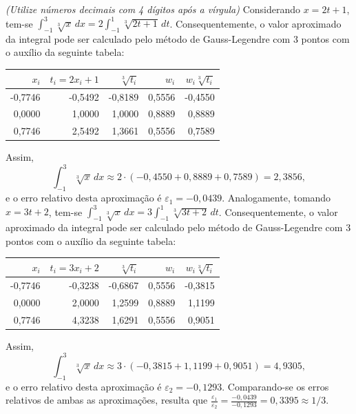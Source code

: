 \documentclass[12pt,a4paper]{article}
\begin{document}
\begin{ExerciseList}
{\color{blue} \textit{(Utilize números decimais com 4 dígitos após a vírgula)}}
\Answer Considerando $x = 2t + 1$, tem-se $
    \int_{-1}^3 \sqrt[3]{x}\, dx
= 2 \int_{-1}^1 \sqrt[3]{2t+1} \,dt
$. Consequentemente, o valor aproximado da integral pode ser calculado pelo método de Gauss-Legendre com 3 pontos com o auxílio da seguinte tabela:
\medskip
\begin{center}
\begin{tabular}{|r|r|r|r|r|}
\hline 
$x_i$ & $t_i = 2x_i+1$ & $\sqrt[3]{t_i}$ & $w_i$ & $w_i \sqrt[3]{t_i}$ \\ 
\hline 
-0,7746 & -0,5492 & -0,8189 & 0,5556 & -0,4550 \\ 
\hline 
 0,0000 &  1,0000 &  1,0000 & 0,8889 &  0,8889 \\ 
\hline 
 0,7746 &  2,5492 &  1,3661 & 0,5556 &  0,7589 \\ 
\hline 
\end{tabular}
\end{center}
\medskip
Assim,
\[
\int_{-1}^3 \sqrt[3]{x}\, dx
\approx 2 \cdot \left( -0,4550 + 0,8889 + 0,7589\right)
= 2,3856,
\]
e o erro relativo desta aproximação é $\varepsilon_1 = -0,0439$.
Analogamente, tomando $x = 3t + 2$, tem-se
$
    \int_{-1}^3 \sqrt[3]{x}\, dx
= 3 \int_{-1}^1 \sqrt[3]{3t+2} \,dt
$. Consequentemente, o valor aproximado da integral pode ser calculado pelo método de Gauss-Legendre com 3 pontos com o auxílio da seguinte tabela:
\medskip
\begin{center}
\begin{tabular}{|r|r|r|r|r|}
\hline 
$x_i$ & $t_i = 3x_i+2$ & $\sqrt[3]{t_i}$ & $w_i$ & $w_i \sqrt[3]{t_i}$ \\ 
\hline 
-0,7746 & -0,3238 & -0,6867 & 0,5556 & -0,3815 \\ 
\hline 
 0,0000 &  2,0000 &  1,2599 & 0,8889 &  1,1199 \\ 
\hline 
 0,7746 &  4,3238 &  1,6291 & 0,5556 &  0,9051 \\ 
\hline 
\end{tabular}
\end{center}
\medskip
Assim,
\[
\int_{-1}^3 \sqrt[3]{x}\, dx
\approx 3 \cdot \left( -0,3815 + 1,1199 + 0,9051 \right)
= 4,9305,
\]
e o erro relativo desta aproximação é $\varepsilon_2 = -0,1293$. Comparando-se os erros relativos de ambas as aproximações, resulta que $\frac{\varepsilon_1}{\varepsilon_2} = \frac{-0,0439}{-0,1293} = 0,3395 \approx 1/3$.


\end{ExerciseList}
\end{document}
